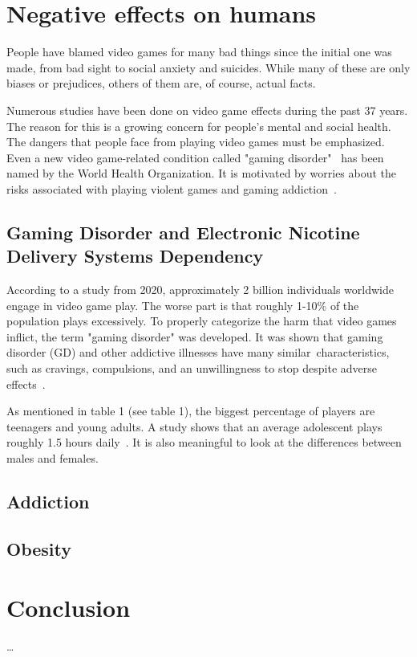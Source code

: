 \documentclass[10pt,twoside,english,a4paper]{article}
\begin{document}
\section{Negative effects on humans}
People have blamed video games for many bad things since the initial one was made, from bad sight to social anxiety and suicides. While many of these are only biases or prejudices, others of them are, of course, actual facts.

Numerous studies have been done on video game effects during the past 37 years. The reason for this is a growing concern for people's mental and social health. The dangers that people face from playing video games must be emphasized. Even a new video game-related condition called "gaming disorder"~\cite{children,disorder} has been named by the World Health Organization. It is motivated by worries about the risks associated with playing violent games and gaming addiction~\cite{children}.

\subsection{Gaming Disorder and Electronic Nicotine Delivery Systems Dependency}
According to a study from 2020, approximately 2 billion individuals worldwide engage in video game play. The worse part is that roughly 1-10\% of the population plays excessively. To properly categorize the harm that video games inflict, the term "gaming disorder" was developed. It was shown that gaming disorder (GD) and other addictive illnesses have many similar characteristics, such as cravings, compulsions, and an unwillingness to stop despite adverse effects~\cite{disorder}.

As mentioned in table 1 (see table 1), the biggest percentage of players are teenagers and young adults. A study shows that an average adolescent plays roughly 1.5 hours daily~\cite{disorder}. It is also meaningful to look at the differences between males and females.

\subsection{Addiction}


\subsection{Obesity}


\section{Conclusion} \label{conclusion}
\ldots




\end{document}
